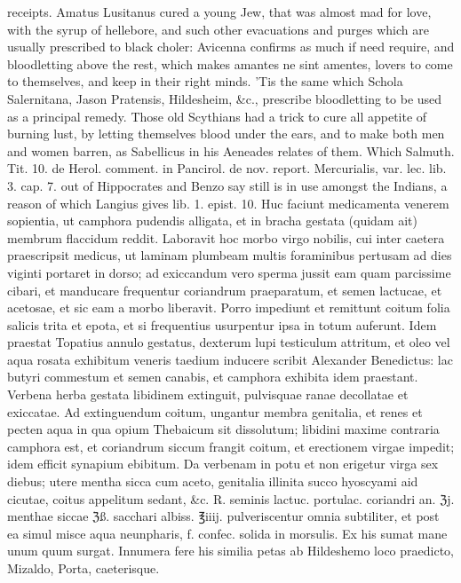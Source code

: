 {receipts. Amatus Lusitanus cured a young Jew, that was almost mad
for love, with the syrup of hellebore, and such other evacuations and
purges which are usually prescribed to black choler: Avicenna
confirms as much if need require, and bloodletting above the
rest, which makes amantes ne sint amentes, lovers to come to
themselves, and keep in their right minds. 'Tis the same which Schola
Salernitana, Jason Pratensis, Hildesheim, \&c., prescribe bloodletting
to be used as a principal remedy. Those old Scythians had a trick to
cure all appetite of burning lust, by  letting themselves blood
under the ears, and to make both men and women barren, as Sabellicus in
his Aeneades relates of them. Which Salmuth. Tit. 10. de Herol.
comment. in Pancirol. de nov. report. Mercurialis, var. lec. lib. 3.
cap. 7. out of Hippocrates and Benzo say still is in use amongst the
Indians, a reason of which Langius gives lib. 1. epist. 10.
Huc faciunt medicamenta venerem sopientia, ut camphora pudendis
alligata, et in bracha gestata (quidam ait) membrum flaccidum reddit.
Laboravit hoc morbo virgo nobilis, cui inter caetera praescripsit
medicus, ut laminam plumbeam multis foraminibus pertusam ad dies
viginti portaret in dorso; ad exiccandum vero sperma jussit eam quam
parcissime cibari, et manducare frequentur coriandrum praeparatum, et
semen lactucae, et acetosae, et sic eam a morbo liberavit. Porro
impediunt et remittunt coitum folia salicis trita et epota, et si
frequentius usurpentur ipsa in totum auferunt. Idem praestat Topatius
annulo gestatus, dexterum lupi testiculum attritum, et oleo vel aqua
rosata exhibitum veneris taedium inducere scribit Alexander Benedictus:
lac butyri commestum et semen canabis, et camphora exhibita idem
praestant. Verbena herba gestata libidinem extinguit, pulvisquae ranae
decollatae et exiccatae. Ad extinguendum coitum, ungantur membra
genitalia, et renes et pecten aqua in qua opium Thebaicum sit
dissolutum; libidini maxime contraria camphora est, et coriandrum
siccum frangit coitum, et erectionem virgae impedit; idem efficit
synapium ebibitum. Da verbenam in potu et non erigetur virga sex
diebus; utere mentha sicca cum aceto, genitalia illinita succo
hyoscyami aid cicutae, coitus appelitum sedant, \&c. ℞. seminis lactuc.
portulac. coriandri an. ℨj. menthae siccae ℨß. sacchari albiss. ℥iiij.
pulveriscentur omnia subtiliter, et post ea simul misce aqua
neunpharis, f. confec. solida in morsulis. Ex his sumat mane unum quum
surgat. Innumera fere his similia petas ab Hildeshemo loco praedicto,
Mizaldo, Porta, caeterisque.

}
